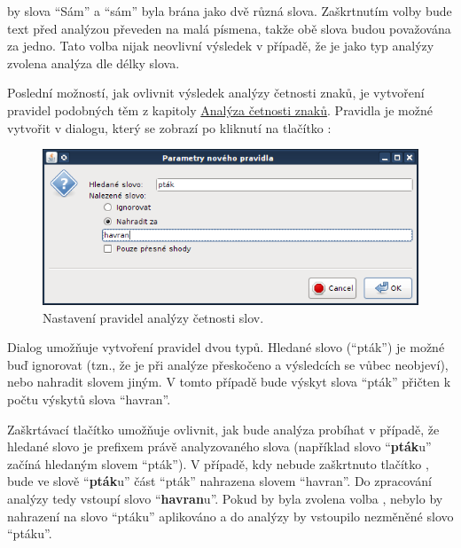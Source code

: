 \documentclass[dp.tex]{subfiles}
\begin{document}
by slova \enquote{Sám} a \enquote{sám} byla brána jako dvě různá slova. Zaškrtnutím volby  bude text před analýzou převeden na malá písmena, takže obě slova budou považována za jedno. Tato volba nijak neovlivní výsledek v případě, že je jako typ analýzy zvolena analýza dle délky slova.

Poslední možností, jak ovlivnit výsledek analýzy četnosti znaků, je vytvoření pravidel podobných těm z kapitoly \hyperref[chap:analyza-cetnosti-znaku]{Analýza četnosti znaků}. Pravidla je možné vytvořit v dialogu, který se zobrazí po kliknutí na tlačítko :

\begin{figure}[H]
\centering
\includegraphics[max width=\textwidth,keepaspectratio=true]{imgs-60-aplikace/gui-word-analysis-rules-dialog}
\caption{Nastavení pravidel analýzy četnosti slov.}
\label{fig:gui-word-analysis-rules-dialog}
\end{figure}

Dialog umožňuje vytvoření pravidel dvou typů. Hledané slovo (\enquote{pták}) je možné buď ignorovat (tzn., že je při analýze přeskočeno a výsledcích se vůbec neobjeví), nebo nahradit slovem jiným. V tomto případě bude výskyt slova \enquote{pták} přičten k počtu výskytů slova \enquote{havran}.

Zaškrtávací tlačítko  umožňuje ovlivnit, jak bude analýza probíhat v případě, že hledané slovo je prefixem právě analyzovaného slova (například slovo \enquote{\textbf{pták}u} začíná hledaným slovem \enquote{pták}). V případě, kdy nebude zaškrtnuto tlačítko , bude ve slově \enquote{\textbf{pták}u} část \enquote{pták} nahrazena slovem \enquote{havran}. Do zpracování analýzy tedy vstoupí slovo \enquote{\textbf{havran}u}. Pokud by byla zvolena volba , nebylo by nahrazení na slovo \enquote{ptáku} aplikováno a do analýzy by vstoupilo nezměněné slovo \enquote{ptáku}.
\end{document}
